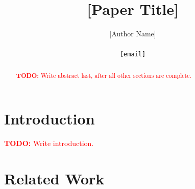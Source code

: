 \documentclass{article}
\title{[Paper Title]}
\author{
  [Author Name] \\
  [Affiliation] \\
  \texttt{[email]} \\
}
\theoremstyle{definition}
\theoremstyle{remark}
\newcommand{\todo}[1]{\textcolor{red}{\textbf{TODO:} #1}}
\begin{document}
\maketitle

\begin{abstract}

\todo{Write abstract last, after all other sections are complete.}
\end{abstract}

\section{Introduction}
\label{sec:introduction}



\todo{Write introduction.}

\section{Related Work}
\label{sec:related_work}

%
\end{document}
